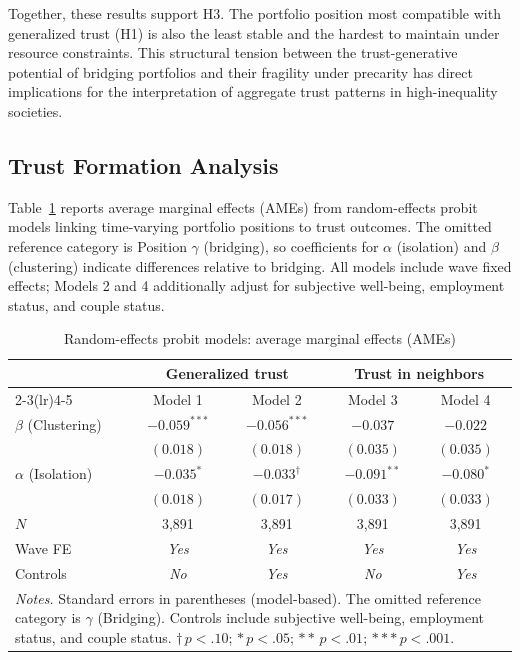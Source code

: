 Together, these results support H3. The portfolio position most compatible with generalized trust (H1) is also the least stable and the hardest to maintain under resource constraints. This structural tension between the trust-generative potential of bridging portfolios and their fragility under precarity has direct implications for the interpretation of aggregate trust patterns in high-inequality societies.

\subsection{Trust Formation Analysis}


Table~\ref{tab:table4} reports average marginal effects (AMEs) from random-effects probit models linking time-varying portfolio positions to trust outcomes. The omitted reference category is Position $\gamma$ (bridging), so coefficients for $\alpha$ (isolation) and $\beta$ (clustering) indicate differences relative to bridging. All models include wave fixed effects; Models 2 and 4 additionally adjust for subjective well-being, employment status, and couple status.

\begin{table}[htbp]
\centering
\caption{Random-effects probit models: average marginal effects (AMEs)\label{tab:table4}}
\begin{tabular}{l cccc}
\toprule
 & \multicolumn{2}{c}{Generalized trust} & \multicolumn{2}{c}{Trust in neighbors} \\
\cmidrule(lr){2-3}\cmidrule(lr){4-5}
 & Model 1 & Model 2 & Model 3 & Model 4 \\
\midrule
$\beta$ (Clustering)  & $-0.059^{***}$ & $-0.056^{***}$ & $-0.037$ & $-0.022$ \\
                      & $(0.018)$      & $(0.018)$      & $(0.035)$ & $(0.035)$ \\
\addlinespace[6pt]
$\alpha$ (Isolation)  & $-0.035^{*}$   & $-0.033^{\dagger}$ & $-0.091^{**}$ & $-0.080^{*}$ \\
                      & $(0.018)$      & $(0.017)$      & $(0.033)$ & $(0.033)$ \\
\midrule
$N$          & 3,891 & 3,891 & 3,891 & 3,891 \\
Wave FE      & \textit{Yes} & \textit{Yes} & \textit{Yes} & \textit{Yes} \\
Controls     & \textit{No}  & \textit{Yes} & \textit{No}  & \textit{Yes} \\
\bottomrule
\multicolumn{5}{p{0.88\linewidth}}{\footnotesize \textit{Notes.} Standard errors in parentheses (model-based). The omitted reference category is $\gamma$ (Bridging). Controls include subjective well-being, employment status, and couple status. $\dagger\,p<.10$; $*\,p<.05$; $**\,p<.01$; $***\,p<.001$.}\\
\end{tabular}
\end{table}

